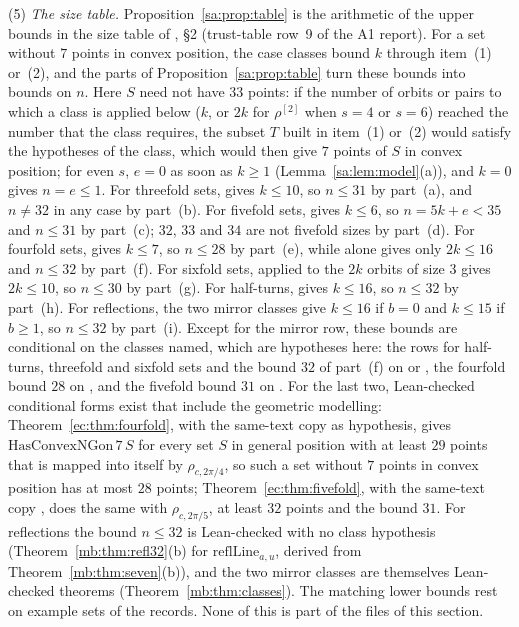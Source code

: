 \begin{remark}
(5) \emph{The size table.} Proposition~\ref{sa:prop:table} is the arithmetic of the upper bounds in the size table of
, \S2 (trust-table row~9 of the A1 report). For a set without $7$ points in convex position,
the case classes bound $k$ through item~(1) or~(2), and the parts of Proposition~\ref{sa:prop:table} turn these
bounds into bounds on $n$. Here $S$ need not have $33$ points: if the number of orbits or pairs to which a class is
applied below ($k$, or $2k$ for $\rho^{[2]}$ when $s=4$ or $s=6$) reached the number that the class requires, the
subset $T$ built in item~(1) or~(2) would satisfy the hypotheses of the class, which would then give $7$ points of
$S$ in convex position; for even $s$, $e=0$ as soon as $k\ge1$ (Lemma~\ref{sa:lem:model}(a)), and $k=0$ gives
$n=e\le1$. For threefold sets,  gives $k\le10$, so $n\le31$ by part~(a), and
$n\ne32$ in any case by part~(b). For fivefold sets,  gives $k\le6$, so $n=5k+e<35$ and $n\le31$ by
part~(c); $32$, $33$ and $34$ are not fivefold sizes by part~(d). For fourfold sets,  gives $k\le7$,
so $n\le28$ by part~(e), while  alone gives only $2k\le16$ and $n\le32$ by part~(f). For sixfold
sets,  applied to the $2k$ orbits of size $3$ gives $2k\le10$, so $n\le30$ by part~(g). For
half-turns,  gives $k\le16$, so $n\le32$ by part~(h). For reflections, the two mirror classes give
$k\le16$ if $b=0$ and $k\le15$ if $b\ge1$, so $n\le32$ by part~(i).
Except for the mirror row, these bounds are conditional on the classes named, which are hypotheses here: the rows
for half-turns, threefold and sixfold sets and the bound $32$ of part~(f) on  or ,
the fourfold bound $28$ on , and the fivefold bound $31$ on . For the last two,
Lean-checked conditional forms exist that include the geometric modelling: Theorem~\ref{ec:thm:fourfold}, with the
same-text copy  as hypothesis, gives $\mathrm{HasConvexNGon}\,7\,S$ for every set $S$ in
general position with at least $29$ points that is mapped into itself by $\rho_{c,2\pi/4}$, so such a set without $7$
points in convex position has at most $28$ points; Theorem~\ref{ec:thm:fivefold}, with the same-text copy
, does the same with $\rho_{c,2\pi/5}$, at least $32$ points and the bound $31$. For
reflections the bound $n\le32$ is Lean-checked with no class hypothesis (Theorem~\ref{mb:thm:refl32}(b) for
$\mathrm{reflLine}_{a,u}$, derived from Theorem~\ref{mb:thm:seven}(b)), and the two mirror classes are themselves
Lean-checked theorems (Theorem~\ref{mb:thm:classes}). The matching lower bounds rest on example sets of the records.
None of this is part of the files of this section.
\end{remark}

